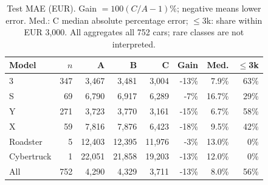 \begin{table}[h!]
\centering\fontsize{8}{9.5}\selectfont\setlength{\tabcolsep}{1.6pt}
\begin{tabular}{lrrrrrrr}
\toprule
Model & $n$ & A & B & C & Gain & Med. & $\leq$3k\\
\midrule
3 & 347 & 3,467 & 3,481 & 3,004 & -13\% & 7.9\% & 63\%\\
S & 69 & 6,790 & 6,917 & 6,289 & -7\% & 16.7\% & 29\%\\
Y & 271 & 3,723 & 3,770 & 3,161 & -15\% & 6.7\% & 58\%\\
X & 59 & 7,816 & 7,876 & 6,423 & -18\% & 9.5\% & 42\%\\
Roadster & 5 & 12,403 & 12,395 & 11,976 & -3\% & 13.0\% & 0\%\\
Cybertruck & 1 & 22,051 & 21,858 & 19,203 & -13\% & 12.0\% & 0\%\\
All & 752 & 4,290 & 4,329 & 3,711 & -13\% & 8.0\% & 56\%\\
\bottomrule
\end{tabular}
\caption{Test MAE (EUR). Gain $=100(C/A-1)\%$; negative means lower error. Med.: C median absolute percentage error; $\leq$3k: share within EUR 3,000. All aggregates all 752 cars; rare classes are not interpreted.}
\label{tab:slices}
\end{table}
